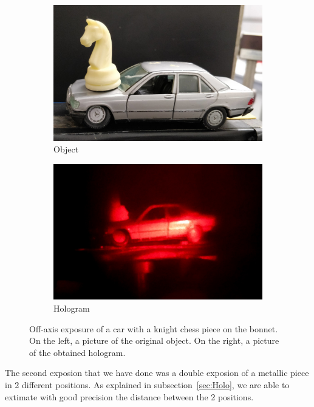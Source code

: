 \documentclass[11pt,a4paper]{article}
\begin{document}
\begin{figure}[ht]
\centering
\begin{subfigure}[b]{0.45\textwidth}
\includegraphics[width=\textwidth]{car_knight}
\caption{Object}
\label{fig:car_knight1}
\end{subfigure}
\begin{subfigure}[b]{0.45\textwidth}
\includegraphics[width=\textwidth]{Off-axis_hologram}
\caption{Hologram}
\label{fig:off_axis_hologram1}
\end{subfigure}
\caption{Off-axis exposure of a car with a knight chess piece on the bonnet. On the left, a picture of the original object. On the right, a picture of the obtained hologram.}
\label{fig:off-axis_exposure}
\end{figure}

The second exposion that we have done was a double exposion of a metallic piece in 2 different positions. As explained in subsection~\ref{sec:Holo}, we are able to extimate with good precision the distance between the 2 positions. 
\end{document}
